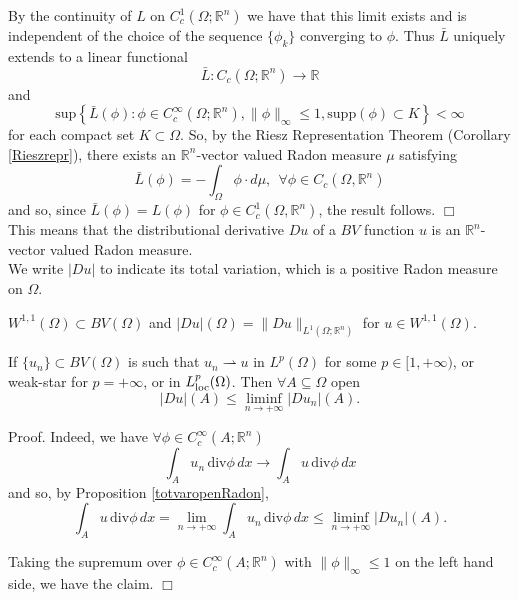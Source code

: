 By the continuity of $L$ on $C^{1}_{c}(\Omega ; \mathbb{R}^{n})$ we have that this limit exists and is independent of the choice of the sequence $\{ \phi_{k} \}$ converging to $\phi$. Thus $\bar L$ uniquely extends to a linear functional 
\[ \bar L : C_{c}(\Omega ; \mathbb{R}^{n}) \to \mathbb{R}  \]
and
\[ \mathrm{sup}\left \{ \bar L (\phi) : \phi \in C_{c}^{\infty}(\Omega ; \mathbb{R}^{n}), \|\phi\|_{\infty} \le 1, \mathrm{supp}(\phi) \subset K \right \} < \infty \]
for each compact set $K \subset \Omega$. So, by the Riesz Representation Theorem (Corollary \ref{Rieszrepr}), there exists an $\mathbb{R}^{n}$-vector valued Radon measure $\mu$ satisfying
\[ \bar L (\phi) = - \int_{\Omega} \phi \cdot d\mu,   \    \ \forall \phi \in C_{c}(\Omega,\mathbb{R}^{n}) \]
and so, since $\bar L (\phi) = L(\phi)$ for $\phi \in C^{1}_{c}(\Omega,\mathbb{R}^{n})$, the result follows. $\Box$ 
\\

This means that the distributional derivative $Du$ of a $BV$ function $u$ is an $\mathbb{R}^{n}$-vector valued Radon measure.
\\
We write $|Du|$ to indicate its total variation, which is a positive Radon measure on $\Omega$.


\begin{remark} $W^{1,1}(\Omega) \subset BV(\Omega)$ and $|Du|(\Omega) = \|Du\|_{L^{1}(\Omega; \mathbb{R}^{n})}$ for $u \in W^{1,1}(\Omega)$.
\end{remark}



\begin{theorem} \label{WLSCBV} If $\{u_{n}\} \subset BV(\Omega)$ is such that $u_{n} \rightharpoonup u$ in $L^{p}(\Omega)$ for some $p \in [1, +\infty)$, or weak-star for $p = +\infty$, or in $L^{p}_{\rm loc}(\Omega)$. Then $\forall A \subseteq \Omega$ open
\[ |Du|(A) \le \liminf\limits_{n \to +\infty} |Du_{n}|(A). \]
\end{theorem}
Proof. Indeed, we have $\forall \phi \in C_{c}^{\infty}(A; \mathbb{R}^{n})$
\[ \int_{A} u_{n}\, \mathrm{div}\phi\, dx \to \int_{A} u\, \mathrm{div}\phi\, dx \]
and so, by Proposition \ref{totvaropenRadon},
\[ \int_{A} u\, \mathrm{div}\phi\, dx = \lim_{n \to +\infty} \int_{A} u_{n}\, \mathrm{div}\phi\, dx \le \liminf\limits_{n \to +\infty} |Du_{n}|(A). \]

Taking the supremum over $\phi \in C_{c}^{\infty}(A; \mathbb{R}^{n})$ with $\|\phi\|_{\infty} \le 1$ on the left hand side, we have the claim. $\Box$



